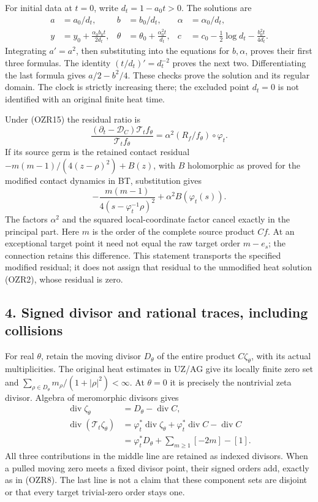 \documentclass[
  10pt,
  a4paper,
]{article}
\begin{document}
For initial data at \(t=0\), write \(d_t=1-a_0t>0\). The solutions are
\[
\begin{aligned}
a&=a_0/d_t,& b&=b_0/d_t,& \alpha&=\alpha_0/d_t,\\
y&=y_0+\frac{\alpha_0b_0t}{2d_t},&
\theta&=\theta_0+\frac{\alpha_0^2t}{d_t},&
c&=c_0-\tfrac12\log d_t-\frac{b_0^2t}{4d_t}.
\end{aligned}\tag{OZR16}
\] Integrating \(a'=a^2\), then substituting into the equations for
\(b,\alpha\), proves their first three formulas. The identity
\((t/d_t)'=d_t^{-2}\) proves the next two. Differentiating the last
formula gives \(a/2-b^2/4\). These checks prove the solution and its
regular domain. The clock is strictly increasing there; the excluded
point \(d_t=0\) is not identified with an original finite heat time.

Under (OZR15) the residual ratio is \[
\frac{(\partial_t-\mathcal D_C)\mathcal T_t f_\theta}
 {\mathcal T_t f_\theta}
=\alpha^2(R_f/f_\theta)\circ\varphi_t.
\tag{OZR17}
\] If its source germ is the retained contact residual
\(-m(m-1)/(4(z-\rho)^2)+B(z)\), with \(B\) holomorphic as proved for the
modified contact dynamics in BT, substitution gives \[
-\frac{m(m-1)}{4(s-\varphi_t^{-1}\rho)^2}
 +\alpha^2B(\varphi_t(s)).
\tag{OZR18}
\] The factors \(\alpha^2\) and the squared local-coordinate factor
cancel exactly in the principal part. Here \(m\) is the order of the
complete source product \(Cf\). At an exceptional target point it need
not equal the raw target order \(m-e_s\); the connection retains this
difference. This statement transports the specified modified residual;
it does not assign that residual to the unmodified heat solution (OZR2),
whose residual is zero.

\subsection{4. Signed divisor and rational traces, including
collisions}\label{signed-divisor-and-rational-traces-including-collisions}

For real \(\theta\), retain the moving divisor \(D_\theta\) of the
entire product \(C\zeta_\theta\), with its actual multiplicities. The
original heat estimates in UZ/AG give its locally finite zero set and
\(\sum_{\rho\in D_\theta}m_\rho/(1+|\rho|^2)<\infty\). At \(\theta=0\)
it is precisely the nontrivial zeta divisor. Algebra of meromorphic
divisors gives \[
\begin{aligned}
\operatorname{div}\zeta_\theta&=D_\theta-\operatorname{div}C,\\
\operatorname{div}(\mathcal T_t\zeta_\theta)
&=\varphi_t^*\operatorname{div}\zeta_\theta
 +\varphi_t^*\operatorname{div}C-\operatorname{div}C\\
&=\varphi_t^*D_\theta+\sum_{m\ge1}[-2m]-[1].
\end{aligned}\tag{OZR19}
\] All three contributions in the middle line are retained as indexed
divisors. When a pulled moving zero meets a fixed divisor point, their
signed orders add, exactly as in (OZR8). The last line is not a claim
that these component sets are disjoint or that every target trivial-zero
order stays one.
\end{document}
